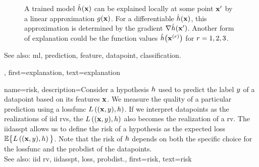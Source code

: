 {{\begin{figure}[H]
\begin{center}
	 	\end{center}
	 	\caption{A trained \gls{model} $\hat{h}({\bf x})$ can be explained 
	     	locally at some point ${\bf x}'$ by a linear approximation $g({\bf x})$. 
	     	For a \gls{differentiable} $\hat{h}({\bf x})$, this approximation is 
	     	determined by the \gls{gradient} $\nabla \hat{h}({\bf x}')$. Another 
	     	form of explanation could be the \gls{function} values $\hat{h}\big({\bf x}^{(r)} \big)$ 
	     	for $r=1, 2, 3$. 
		\label{fig_explanation_dict}}
	 	\end{figure} 
		See also: \gls{ml}, \gls{prediction}, \gls{feature}, \gls{datapoint}, \gls{classification}.},
	first={explanation},
	text={explanation} 
}

{name={risk},
	description={Consider a \gls{hypothesis} $h$ used to predict the \gls{label} 
		$y$ of a \gls{datapoint} based on its \glspl{feature} ${\bf x}$. We measure 
		the quality of a particular \gls{prediction} using a \gls{lossfunc} $L\left(({\bf x},y),h \right)$. 
		If we interpret \glspl{datapoint} as the \glspl{realization} of \gls{iid} \glspl{rv}, 
		the $L\left(({\bf x},y),h \right)$ also becomes the \gls{realization} 
		of a \gls{rv}. The \gls{iidasspt} allows us to define the risk of a \gls{hypothesis} 
		as the expected \gls{loss} $\mathbb{E} \big\{L\left(({\bf x},y),h \right) \big\}$. 
		Note that the risk of $h$ depends on both the specific choice for the \gls{lossfunc} and the 
		\gls{probdist} of the \glspl{datapoint}.
					\\ 
		See also: \gls{iid} \gls{rv}, \gls{iidasspt}, \gls{loss}, \gls{probdist}.},
	first={risk},
	text={risk} 
}

